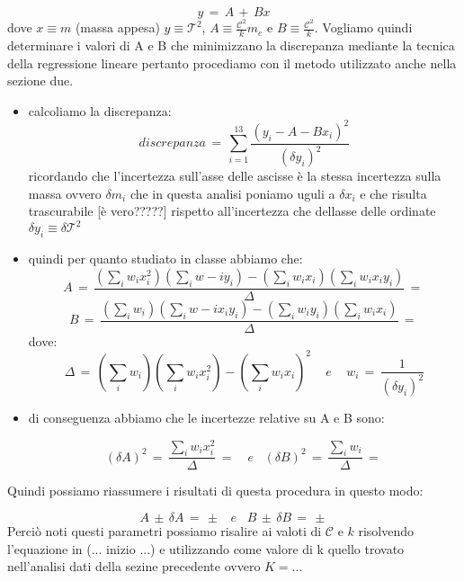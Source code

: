 \begin{equation*}
	y \,=\, A \,+\, Bx
\end{equation*}
%
dove $x \equiv m$ (massa appesa) $y \equiv \mathcal{T}^2$, $A \equiv \frac{\mathcal{C}^2}{k} m_e$ e $B \equiv \frac{\mathcal{C}^2}{k}$.
Vogliamo quindi determinare i valori di A e B che minimizzano la discrepanza mediante la tecnica della regressione lineare pertanto procediamo con il metodo utilizzato anche nella sezione due.
\begin{itemize}
\item{calcoliamo la discrepanza:
		\begin{equation*}
			discrepanza \,=\, \sum_{i=1}^{13} \frac{(y_i - A - Bx_i)^2}{(\delta y_i)^2}
		\end{equation*}
		ricordando che l'incertezza sull'asse delle ascisse è la stessa incertezza sulla massa ovvero $\delta m_i$ che in questa analisi poniamo uguli a $\delta x_i$ e che risulta trascurabile [è vero?????] rispetto all'incertezza che dellasse delle ordinate $\delta y_i \equiv \delta \mathcal{T}^2$}
\item{quindi per quanto studiato in classe abbiamo che:
		\begin{equation*}
			A \,=\, \frac{(\sum_i w_i x_i^2)(\sum_i w-i y_i) - (\sum_i w_i x_i)(\sum_i w_i x_i y_i)}{\Delta} \,=\,
		\end{equation*}
		\begin{equation*}
			B \,=\, \frac{(\sum_i w_i)(\sum_i w-i x_i y_i) - (\sum_i w_i y_i)(\sum_i w_i x_i)}{\Delta} \,=\,
		\end{equation*}
		dove:
		\begin{equation*}
			\Delta \,=\, (\sum_i w_i)(\sum_i w_i x_i^2) - (\sum_i w_i x_i)^2 \,\,\,\,\,\,\, e \,\,\,\,\,\,\,
			w_i \,=\, \frac{1}{(\delta y_i)^2}
		\end{equation*}}
\item{di conseguenza abbiamo che le incertezze relative su A e B sono:

		\begin{equation*}
			(\delta A)^2 \,=\, \frac{\sum_i w_i x_i^2}{\Delta} \,=\,  \,\,\,\,\, e \,\,\,\,\,
			(\delta B)^2 \,=\, \frac{\sum_i w_i}{\Delta} \,=\,
		\end{equation*}}
\end{itemize} 
Quindi possiamo riassumere i risultati di questa procedura in questo modo:

\begin{equation*}
	A \,\pm\, \delta A \,=\, \pm \,\,\,\,\, e \,\,\,\,\,
	B \,\pm\, \delta B \,=\, \pm
\end{equation*}
Perciò noti questi parametri possiamo risalire ai valoti di $\mathcal{C}$ e $k$ risolvendo l'equazione in (... inizio ...) e utilizzando come valore di k quello trovato nell'analisi dati della sezine precedente ovvero $K = ...$

